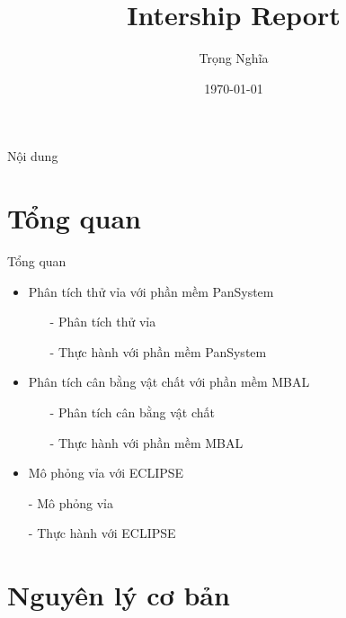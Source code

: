 \documentclass[11pt]{beamer}
\title[Japan Vietnam Petroleum Company]{Intership Report}
\author{Trọng Nghĩa}
\institute{PVU}
\date{\today}
\begin{document}
\begin{frame}
  \titlepage
\end{frame}

\begin{frame}{Nội dung}
  \tableofcontents
\end{frame}

\section{Tổng quan}
\begin{frame}{Tổng quan}
	\begin{itemize}
		\item Phân tích thử vỉa với phần mềm PanSystem
			\begin{itemize}
				\item[-] Phân tích thử vỉa
				\item[-] Thực hành với phần mềm PanSystem
			\end{itemize}
		\item Phân tích cân bằng vật chất với phần mềm MBAL
			\begin{itemize}
				\item[-] Phân tích cân bằng vật chất
				\item[-] Thực hành với phần mềm MBAL
			\end{itemize}
		\item Mô phỏng vỉa với ECLIPSE
			\item[-] Mô phỏng vỉa
			\item[-] Thực hành với ECLIPSE
	\end{itemize}
\end{frame}
\section{Nguyên lý cơ bản}
\end{document}
